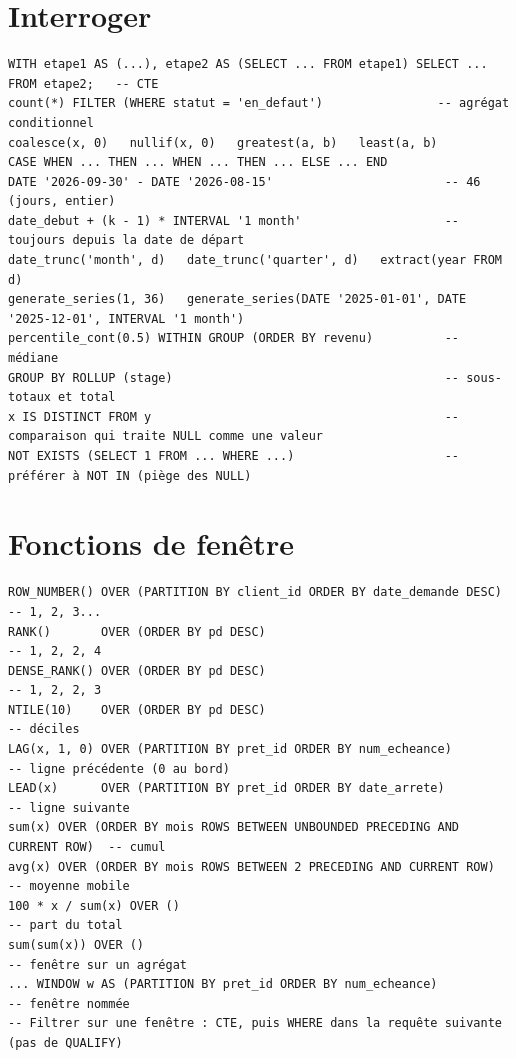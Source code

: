 \section{Interroger}
\begin{lstlisting}[style=long]
WITH etape1 AS (...), etape2 AS (SELECT ... FROM etape1) SELECT ... FROM etape2;   -- CTE
count(*) FILTER (WHERE statut = 'en_defaut')                -- agrégat conditionnel
coalesce(x, 0)   nullif(x, 0)   greatest(a, b)   least(a, b)
CASE WHEN ... THEN ... WHEN ... THEN ... ELSE ... END
DATE '2026-09-30' - DATE '2026-08-15'                        -- 46 (jours, entier)
date_debut + (k - 1) * INTERVAL '1 month'                    -- toujours depuis la date de départ
date_trunc('month', d)   date_trunc('quarter', d)   extract(year FROM d)
generate_series(1, 36)   generate_series(DATE '2025-01-01', DATE '2025-12-01', INTERVAL '1 month')
percentile_cont(0.5) WITHIN GROUP (ORDER BY revenu)          -- médiane
GROUP BY ROLLUP (stage)                                      -- sous-totaux et total
x IS DISTINCT FROM y                                         -- comparaison qui traite NULL comme une valeur
NOT EXISTS (SELECT 1 FROM ... WHERE ...)                     -- préférer à NOT IN (piège des NULL)
\end{lstlisting}

\section{Fonctions de fenêtre}
\begin{lstlisting}[style=long]
ROW_NUMBER() OVER (PARTITION BY client_id ORDER BY date_demande DESC)      -- 1, 2, 3...
RANK()       OVER (ORDER BY pd DESC)                                       -- 1, 2, 2, 4
DENSE_RANK() OVER (ORDER BY pd DESC)                                       -- 1, 2, 2, 3
NTILE(10)    OVER (ORDER BY pd DESC)                                       -- déciles
LAG(x, 1, 0) OVER (PARTITION BY pret_id ORDER BY num_echeance)             -- ligne précédente (0 au bord)
LEAD(x)      OVER (PARTITION BY pret_id ORDER BY date_arrete)              -- ligne suivante
sum(x) OVER (ORDER BY mois ROWS BETWEEN UNBOUNDED PRECEDING AND CURRENT ROW)  -- cumul
avg(x) OVER (ORDER BY mois ROWS BETWEEN 2 PRECEDING AND CURRENT ROW)       -- moyenne mobile
100 * x / sum(x) OVER ()                                                   -- part du total
sum(sum(x)) OVER ()                                                        -- fenêtre sur un agrégat
... WINDOW w AS (PARTITION BY pret_id ORDER BY num_echeance)               -- fenêtre nommée
-- Filtrer sur une fenêtre : CTE, puis WHERE dans la requête suivante (pas de QUALIFY)
\end{lstlisting}

